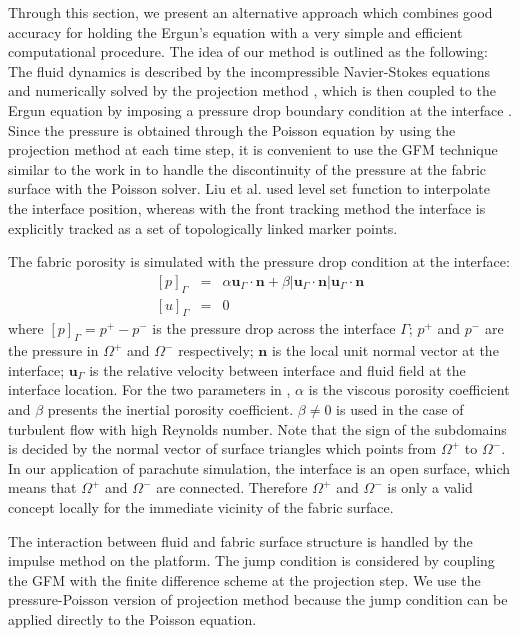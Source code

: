 Through this section, we present an alternative approach which combines 
good accuracy for holding the Ergun's equation with a very simple and efficient 
computational procedure. The idea of our method is 
outlined as the following: The fluid dynamics is 
described by the incompressible Navier-Stokes equations and numerically 
solved by the projection method \cite{KimMoin85}, 
which is then coupled to the Ergun equation \cite{nield2013} by imposing a pressure drop boundary condition at the interface \cite{caiazzo2011}. Since the pressure is obtained 
through the Poisson equation by using the projection method at each time step, 
it is convenient to use the GFM technique similar to the work in 
\cite{fedkiw1999,kang2000boundary,liu2000boundary} to handle the 
discontinuity of the pressure at the fabric surface with the Poisson 
solver. Liu et al. \cite{liu2000boundary} used level set function to 
interpolate the interface position, whereas with the front tracking method 
the interface is explicitly tracked as a set of topologically linked marker points.

The fabric porosity is simulated with the pressure drop condition at the interface:
\begin{eqnarray} \label{jumpcond} {[p]}_{\Gamma} &=& \alpha
\mathbf{u}_\Gamma\cdot \mathbf{n} + \beta |\mathbf{u}_\Gamma\cdot \mathbf{n}|
\mathbf{u}_\Gamma\cdot \mathbf{n} \\
{[u]}_{\Gamma} &=& 0 \end{eqnarray}
where $[p]_{\Gamma}=p^+ - p^-$ is the
pressure drop across the interface $\Gamma$; $p^+$ and $p^-$ are the pressure in
$\Omega^+$ and $\Omega^-$ respectively; $\mathbf{n}$ is the local unit normal
vector at the interface; $\mathbf{u}_\Gamma$ is the relative velocity between
interface and fluid field at the interface location. For the two parameters in
, $\alpha$ is the viscous porosity coefficient and $\beta$ presents
the inertial porosity coefficient. $\beta \neq 0$ is used in the case of
turbulent flow with high Reynolds number.  Note that the sign of the subdomains
is decided by the normal vector of surface triangles which points from
$\Omega^+$ to $\Omega^-$.  In our application of parachute simulation, the
interface is an open surface, which means that $\Omega^+$ and $\Omega^-$ are
connected. Therefore $\Omega^+$ and $\Omega^-$ is only a valid concept locally
for the immediate vicinity of the fabric surface.

The interaction between fluid and fabric surface structure is handled by the
impulse method \cite{KimLiLi12} on the \FronTierp platform. The jump condition
 is considered by coupling the GFM with the finite difference
scheme at the projection step. We use the pressure-Poisson version of
projection method because the jump condition can be applied directly to the
Poisson equation.

